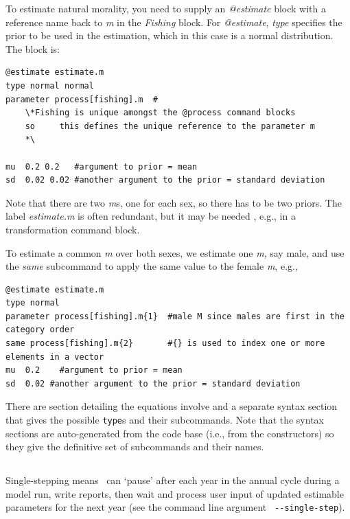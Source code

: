 To estimate natural morality, you need to supply an \textit{@estimate} block with a reference name back to \textit{m} in the \textit{Fishing} block. For \textit{@estimate}, \textit{type} specifies the prior to be used in the estimation, which in this case is a normal distribution. The block is:
{\small{\begin{verbatim}
@estimate estimate.m
type normal normal
parameter process[fishing].m  #
    \*Fishing is unique amongst the @process command blocks
    so     this defines the unique reference to the parameter m
    *\

mu  0.2 0.2   #argument to prior = mean
sd  0.02 0.02 #another argument to the prior = standard deviation
\end{verbatim}}}

Note that there are two \textit{m}s, one for each sex, so there has to be two priors. The \textit{\@estiamte} label \textit{estimate.m} is often redundant, but it may be needed , e.g., in a transformation command block.

To estimate a common \textit{m} over both sexes, we estimate one \textit{m}, say male, and use the \textit{same} subcommand to apply the same value to the female \textit{m}, e.g.,

{\small{\begin{verbatim}
@estimate estimate.m
type normal 
parameter process[fishing].m{1}  #male M since males are first in the category order
same process[fishing].m{2}       #{} is used to index one or more elements in a vector
mu  0.2    #argument to prior = mean
sd  0.02 #another argument to the prior = standard deviation
\end{verbatim}}}

There are section detailing the equations involve and a separate syntax section that gives the possible \texttt{type}s and their subcommands.
Note that the syntax sections are auto-generated from the code base (i.e., from the constructors) so they give the definitive set of subcommands and their names. 

\subsection{\label{sec:singlestepping}}

Single-stepping means \CNAME~can `pause' after each year in the annual cycle during a model run, write reports, then wait and process user input of updated estimable parameters for the next year (see the command line argument \texttt{ -{}-single-step}).

